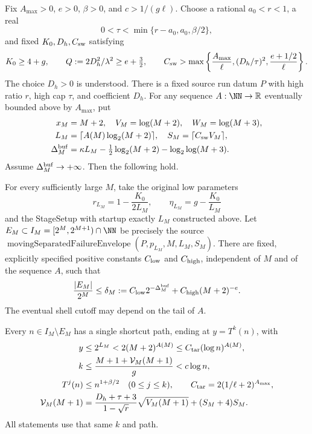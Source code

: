 \begin{theorem}
\label{thm:Shaik-refined-moving-endpoint}
Fix \(A_{\max}>0\), \(e>0\), \(\beta>0\), and
\(c>1/(g\ell)\). Choose a rational \(a_0<r<1\), a real
\[
 0<\tau<\min\{r-a_0,a_0,\beta/2\},
\]
and fixed \(K_0,D_h,C_{\rm sw}\) satisfying
\begin{equation}\label{eq:Shaik-refined-moving-domain}
 K_0\ge4+g,\qquad
 Q:=2D_h^2/\lambda^2\ge e+\tfrac32,\qquad
 C_{\rm sw}>\max\left\{\frac{A_{\max}}{\ell},
                  (D_h/\tau)^2,\frac{e+1/2}{\ell}\right\}.
\end{equation}
The choice \(D_h>0\) is understood. There is a fixed source run datum
\(P\) with high ratio \(r\), high cap \(\tau\), and coefficient \(D_h\).
For any sequence \(A:\NN\to\mathbb R\) eventually bounded above by
\(A_{\max}\), put
\begin{equation}\label{eq:Shaik-refined-moving-buffer}
 \begin{split}
 x_M&=M+2,\quad V_M=\log(M+2),\quad W_M=\log(M+3),\\
 L_M&=\lceil A(M)\log_2(M+2)\rceil,\quad
 S_M=\lceil C_{\rm sw}V_M\rceil,\\
 \Delta_M^{\rm buf}
   &=\kappa L_M-\tfrac12\log_2(M+2)-\log_2\log(M+3).
 \end{split}
\end{equation}
Assume \(\Delta_M^{\rm buf}\to+\infty\). Then the following hold.

For every sufficiently large \(M\), take the original low parameters
\[
 r_{L_M}=1-\frac{K_0}{2L_M},\qquad
 \eta_{L_M}=g-\frac{K_0}{L_M}
\]
and the StageSetup with startup exactly \(L_M\) constructed above.
Let \(E_M\subset I_M=[2^M,2^{M+1})\cap\NN\) be precisely the source
\(\operatorname{movingSeparatedFailureEnvelope}(P,p_{L_M},M,L_M,S_M)\).
There are fixed, explicitly specified positive constants \(C_{\rm low}\)
and \(C_{\rm high}\), independent of \(M\) and of the sequence \(A\), such that
\begin{equation}\label{eq:Shaik-refined-moving-profile}
 \frac{|E_M|}{2^M}\le
 \delta_M:=C_{\rm low}2^{-\Delta_M^{\rm buf}}
                    +C_{\rm high}(M+2)^{-e}.
\end{equation}
The eventual shell cutoff may depend on the tail of \(A\).

Every \(n\in I_M\setminus E_M\) has a single shortcut path, ending at
\(y=T^k(n)\), with
\begin{equation}\label{eq:Shaik-refined-moving-witness}
 \begin{split}
 y&\le2^{L_M}<2(M+2)^{A(M)}
       \le C_{\rm tar}(\log n)^{A(M)},\\
 k&\le \frac{M+1+\mathcal V_M(M+1)}g<c\log n,\\
 T^j(n)&\le n^{1+\beta/2}\quad(0\le j\le k),\qquad
 C_{\rm tar}=2(1/\ell+2)^{A_{\max}},\\
 \mathcal V_M(M+1)
   &=\frac{D_h+\tau+3}{1-\sqrt r}\sqrt{V_M(M+1)}
                         +(S_M+4)S_M .
 \end{split}
\end{equation}
All statements use that same \(k\) and path.


\end{theorem}

